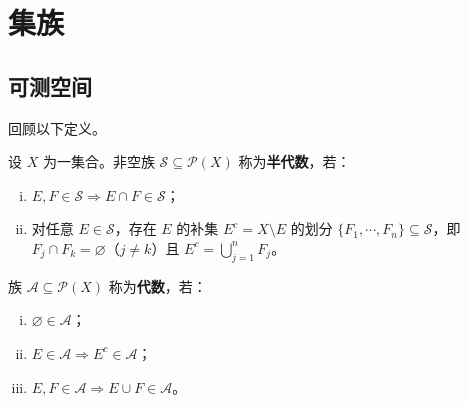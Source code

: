 \documentclass[../../main.tex]{subfiles}%
\begin{document}
\section{集族}\label{section:ch01-集族}

\subsection{可测空间}\label{subsection:ch01-可测空间}

回顾以下定义。

\begin{definition}\label{definition:ch01-半代数代数}
设 $X$ 为一集合。非空族 $\mathcal{S}\subseteq\mathcal{P}(X)$ 称为\textbf{半代数}，若：
\begin{enumerate}[(i)]
\item $E,F\in\mathcal{S}\Rightarrow E\cap F\in\mathcal{S}$；
\item 对任意 $E\in\mathcal{S}$，存在 $E$ 的补集 $E^c=X\setminus E$ 的划分 $\{F_1,\cdots,F_n\}\subseteq\mathcal{S}$，即 $F_j\cap F_k=\varnothing$（$j\neq k$）且 $E^c=\bigcup_{j=1}^nF_j$。
\end{enumerate}
族 $\mathcal{A}\subseteq\mathcal{P}(X)$ 称为\textbf{代数}，若：
\begin{enumerate}[(i)]
\item $\varnothing\in\mathcal{A}$；
\item $E\in\mathcal{A}\Rightarrow E^c\in\mathcal{A}$；
\item $E,F\in\mathcal{A}\Rightarrow E\cup F\in\mathcal{A}$。
\end{enumerate}
\end{definition}
\end{document}
